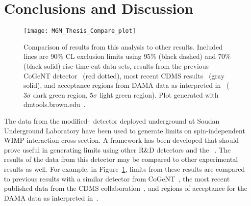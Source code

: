 	\section{Conclusions and Discussion}
	\label{sec:LowMassWIMPConclusions}


		\begin{figure}
			\centering
			\texttt{[image: MGM\_Thesis\_Compare\_plot]}
			\caption[Comparison of exclusions to CDMS, DAMA, and previous CoGeNT results.]
			{Comparison of results from this analysis to other results.  Included lines are 90\% CL 
			exclusion limits using 95\% (black dashed) and 70\% (black solid) rise-time-cut data sets, 
			results from the previous CoGeNT detector~\cite{Aalseth:2008aa} (red dotted), 
			most recent CDMS results~\cite{Ahmed:2009zw} (gray solid), and acceptance regions
			from DAMA data as interpreted in~\cite{Savage:2008er} ($3\sigma$ dark green region,
			$5\sigma$ light green region).  Plot generated with dmtools.brown.edu~\cite{Gai03}.}
			\label{fig:BeGeLimitsComparedToOtherDataSets}
		\end{figure}		

The data from the modified-\bege~detector deployed underground at Soudan Underground Laboratory have been used to generate limits on spin-independent WIMP interaction cross-section.  A framework has been developed that should prove useful in generating limits using other R\&D detectors and the \MJ~\minmod.  The results of the data from this detector may be compared to other experimental results as well.  For example, in Figure~\ref{fig:BeGeLimitsComparedToOtherDataSets}, limits from these results are compared to previous results with a similar detector from CoGeNT~\cite{Aalseth:2008aa}, the most recent published data from the CDMS collaboration~\cite{Ahmed:2009zw}, and regions of acceptance for the DAMA data as interpreted in~\cite{Savage:2008er}.  

